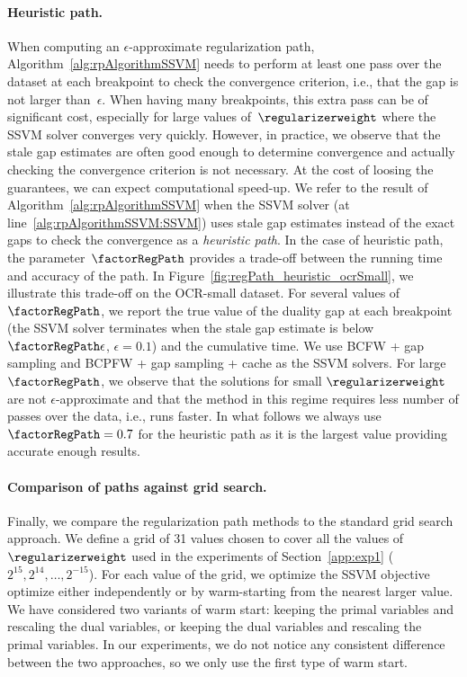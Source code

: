 \documentclass{article}
\begin{document}
\paragraph{Heuristic path.}
When computing an $\epsilon$-approximate regularization path, Algorithm~\ref{alg:rpAlgorithmSSVM} needs to perform at least one pass over the dataset at each breakpoint to check the convergence criterion, i.e., that the gap is not larger than~$\epsilon$.
When having many breakpoints, this extra pass can be of significant cost, especially for large values of~$\regularizerweight$ where the SSVM solver converges very quickly.
However, in practice, we observe that the stale gap estimates are often good enough to determine convergence and actually checking the convergence criterion is not necessary.
At the cost of loosing the guarantees, we can expect computational speed-up.
We refer to the result of Algorithm~\ref{alg:rpAlgorithmSSVM} when the SSVM solver (at line~\ref{alg:rpAlgorithmSSVM:SSVM}) uses stale gap estimates instead of the exact gaps to check the convergence as a \emph{heuristic path}.
In the case of heuristic path, the parameter~$\factorRegPath$ provides a trade-off between the running time and accuracy of the path.
In Figure~\ref{fig:regPath_heuristic_ocrSmall}, we illustrate this trade-off on the OCR-small dataset.
For several values of~$\factorRegPath$, we report the true value of the duality gap at each breakpoint (the SSVM solver terminates when the stale gap estimate is below~$\factorRegPath\epsilon$, $\epsilon=0.1$) and the cumulative time.
We use BCFW + gap sampling and BCPFW + gap sampling + cache as the SSVM solvers.
For large $\factorRegPath$, we observe that the solutions for small $\regularizerweight$ are not $\epsilon$-approximate and that the method in this regime requires less number of passes over the data, i.e., runs faster.
In what follows we always use $\factorRegPath =0.7$ for the heuristic path as it is the largest value providing accurate enough results.



%
%
%
%
%
%
%
%

\paragraph{Comparison of paths against grid search.}
Finally, we compare the regularization path methods to the standard grid search approach.
We define a grid of 31 values chosen to cover all the values of $\regularizerweight$ used in the experiments of Section~\ref{app:exp1} ($2^{15},2^{14},\dots,2^{-15}$).
For each value of the grid, we optimize the SSVM objective optimize either independently or by warm-starting from the nearest larger value.
We have considered two variants of warm start: keeping the primal variables and rescaling the dual variables, or keeping the dual variables and rescaling the primal variables.
In our experiments, we do not notice any consistent difference between the two approaches, so we only use the first type of warm start.
\end{document}
